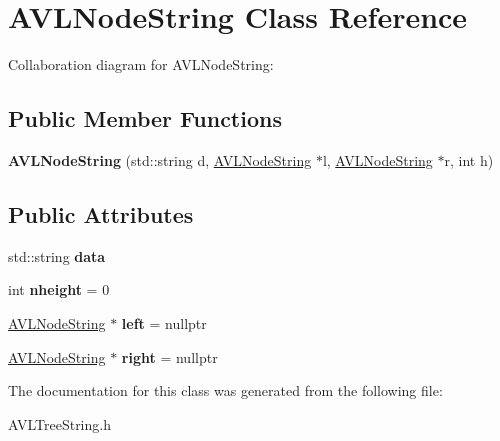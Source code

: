 \hypertarget{classAVLNodeString}{}\section{A\+V\+L\+Node\+String Class Reference}
\label{classAVLNodeString}


Collaboration diagram for A\+V\+L\+Node\+String\+:
\subsection*{Public Member Functions}
\begin{DoxyCompactItemize}
\item 
{\bfseries A\+V\+L\+Node\+String} (std\+::string d, \hyperlink{classAVLNodeString}{A\+V\+L\+Node\+String} $\ast$l, \hyperlink{classAVLNodeString}{A\+V\+L\+Node\+String} $\ast$r, int h)\hypertarget{classAVLNodeString_a1aa980b8c9d716a8d311869d09bd8084}{}\label{classAVLNodeString_a1aa980b8c9d716a8d311869d09bd8084}

\end{DoxyCompactItemize}
\subsection*{Public Attributes}
\begin{DoxyCompactItemize}
\item 
std\+::string {\bfseries data}\hypertarget{classAVLNodeString_a7f4c4ea8d91788383f36c06f848d8f80}{}\label{classAVLNodeString_a7f4c4ea8d91788383f36c06f848d8f80}

\item 
int {\bfseries nheight} = 0\hypertarget{classAVLNodeString_aa0c2709b348f3e8387b6e0c070801813}{}\label{classAVLNodeString_aa0c2709b348f3e8387b6e0c070801813}

\item 
\hyperlink{classAVLNodeString}{A\+V\+L\+Node\+String} $\ast$ {\bfseries left} = nullptr\hypertarget{classAVLNodeString_ade44285024761745485007e533970f3c}{}\label{classAVLNodeString_ade44285024761745485007e533970f3c}

\item 
\hyperlink{classAVLNodeString}{A\+V\+L\+Node\+String} $\ast$ {\bfseries right} = nullptr\hypertarget{classAVLNodeString_aba8b4f9902d757111bf02cf281d3d584}{}\label{classAVLNodeString_aba8b4f9902d757111bf02cf281d3d584}

\end{DoxyCompactItemize}


The documentation for this class was generated from the following file\+:\begin{DoxyCompactItemize}
\item 
A\+V\+L\+Tree\+String.\+h\end{DoxyCompactItemize}
